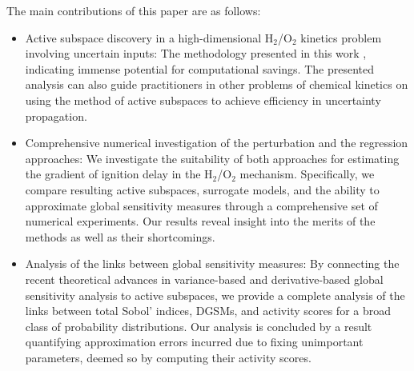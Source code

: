 The main contributions of this paper are as follows: 
\begin{itemize}
\item 
Active subspace
discovery in a high-dimensional H$_2$/O$_2$ kinetics problem involving 
uncertain inputs: The methodology presented in this work
, indicating immense potential
for computational savings. The presented
analysis can also guide practitioners in other problems of chemical kinetics on using the
method of active subspaces to achieve efficiency in uncertainty propagation.  
\item Comprehensive numerical investigation of the perturbation and the regression approaches: 
We investigate the suitability of both approaches
for estimating the gradient of ignition delay in the H$_2$/O$_2$ mechanism.
Specifically, we compare resulting
active subspaces, surrogate models, and the ability to approximate global
sensitivity measures through a comprehensive set of numerical experiments. Our
results reveal insight into the merits of the methods as well as
their shortcomings.  
\item Analysis of the links between  
global sensitivity measures: 
By connecting the recent theoretical advances in variance-based and
derivative-based global sensitivity analysis to active subspaces, we provide a complete analysis
of the links between total Sobol' indices, DGSMs, and activity scores for a broad
class of probability distributions. Our analysis is concluded by a result quantifying
approximation errors incurred due to fixing unimportant parameters, deemed so by 
computing their activity scores.  

\end{itemize}

